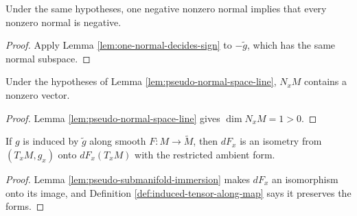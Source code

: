 \begin{lemma}
\label{lem:one-normal-decides-sign-neg}





Under the same hypotheses, one negative nonzero normal implies that every nonzero normal is negative.
\end{lemma}
\begin{proof}

\sketch Apply Lemma \ref{lem:one-normal-decides-sign} to $-\widetilde g$, which has the same normal subspace.
\end{proof}

\begin{lemma}
\label{lem:exists-nonzero-normal}





Under the hypotheses of Lemma \ref{lem:pseudo-normal-space-line}, $N_xM$ contains a nonzero vector.
\end{lemma}
\begin{proof}

\sketch Lemma \ref{lem:pseudo-normal-space-line} gives $\dim N_xM=1>0$.
\end{proof}

\begin{lemma}
\label{lem:differential-isometry-tangent-range}





If $g$ is induced by $\widetilde g$ along smooth $F:M\to\widetilde M$, then $dF_x$ is an isometry from $(T_xM,g_x)$ onto $dF_x(T_xM)$ with the restricted ambient form.
\end{lemma}
\begin{proof}

\sketch Lemma \ref{lem:pseudo-submanifold-immersion} makes $dF_x$ an isomorphism onto its image, and Definition \ref{def:induced-tensor-along-map} says it preserves the forms.
\end{proof}


